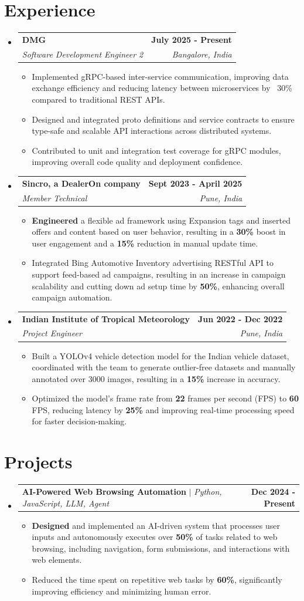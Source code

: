 \documentclass[letterpaper,11pt]{article}
\makeatletter
\newcommand{\resumeItem}[1]{
  \item\small{
	{#1 \vspace{-2pt}}
  }
}
\newcommand{\resumeSubheading}[4]{
  \vspace{-2pt}\item
	\begin{tabular*}{1.0\textwidth}[t]{l@{\extracolsep{\fill}}r}
  	\textbf{#1} & \textbf{\small #2} \\
  	\textit{\small#3} & \textit{\small #4} \\
	\end{tabular*}\vspace{-7pt}
}
\newcommand{\resumeProjectHeading}[2]{
	\item
	\begin{tabular*}{1.001\textwidth}{l@{\extracolsep{\fill}}r}
  	\small#1 & \textbf{\small #2}\\
	\end{tabular*}\vspace{-7pt}
}
\newcommand{\resumeSubHeadingListStart}{\begin{itemize}[leftmargin=0.0in, label={}]}
\newcommand{\resumeSubHeadingListEnd}{\end{itemize}}
\newcommand{\resumeItemListStart}{\begin{itemize}}
\newcommand{\resumeItemListEnd}{\end{itemize}\vspace{-5pt}}
\makeatother
\begin{document}
\section{Experience}
  \resumeSubHeadingListStart
  	\resumeSubheading
  	{DMG}{July 2025 - Present}
  	{Software Development Engineer 2}{Bangalore, India}
  	\resumeItemListStart
    	\resumeItem{Implemented gRPC-based inter-service communication, improving data exchange efficiency and reducing latency between microservices by ~30\% compared to traditional REST APIs.}
    	\resumeItem{Designed and integrated proto definitions and service contracts to ensure type-safe and scalable API interactions across distributed systems.}
        \resumeItem{Contributed to unit and integration test coverage for gRPC modules, improving overall code quality and deployment confidence.}
	\resumeItemListEnd
	\resumeSubheading
  	{Sincro, a DealerOn company}{Sept 2023 - April 2025}
  	{Member Technical}{Pune, India}
  	\resumeItemListStart
    	\resumeItem{\textbf{Engineered} a flexible ad framework using Expansion tags and inserted offers and content based on user behavior, resulting in a \textbf{30\%} boost in user engagement and a \textbf{15\%} reduction in manual update time.}
    	\resumeItem{Integrated Bing Automotive Inventory advertising RESTful API to support feed-based ad campaigns, resulting in an increase in campaign scalability and cutting down ad setup time by \textbf{50\%}, enhancing overall campaign automation.}
	\resumeItemListEnd
    \resumeSubheading
  	{Indian Institute of Tropical Meteorology}{Jun 2022 - Dec 2022}
  	{Project Engineer}{Pune, India}
  	\resumeItemListStart
    	\resumeItem{Built a YOLOv4 vehicle detection model for the Indian vehicle dataset, coordinated with the team to generate outlier-free datasets and manually annotated over 3000 images, resulting in a \textbf{15\%} increase in accuracy.}
    	\resumeItem{Optimized the model's frame rate from \textbf{22} frames per second (FPS) to \textbf{60} FPS, reducing latency by \textbf{25\%} and improving real-time processing speed for faster decision-making.}
	\resumeItemListEnd
  \resumeSubHeadingListEnd
\vspace{-16pt}

\section{Projects}
	\vspace{-5pt}
	\resumeSubHeadingListStart
	\resumeProjectHeading
      	{\textbf{AI-Powered Web Browsing Automation} $|$ \emph{Python, JavaScript, LLM, Agent}}{Dec 2024 - Present}
      	\resumeItemListStart
        	\resumeItem{\textbf{Designed} and implemented an AI-driven system that processes user inputs and autonomously executes over \textbf{50\%} of tasks related to web browsing, including navigation, form submissions, and interactions with web elements.}
        	\resumeItem{Reduced the time spent on repetitive web tasks by \textbf{60\%}, significantly improving efficiency and minimizing human error.}
      	\resumeItemListEnd
	\resumeSubHeadingListEnd
\vspace{-15pt}
\end{document}

